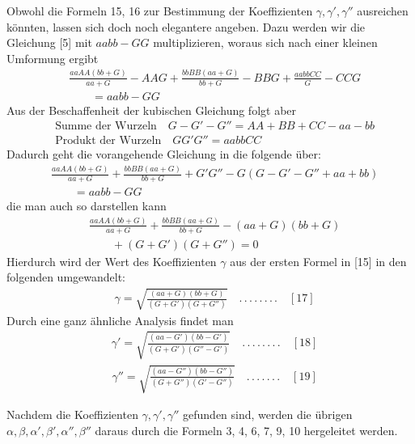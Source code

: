 \begingroup
\renewcommand{\arraystretch}{1.45}
Obwohl die Formeln 15, 16 zur Bestimmung der Koeffizienten $\gamma,\gamma',\gamma''$ ausreichen könnten, lassen sich doch noch elegantere angeben. Dazu werden wir die Gleichung [5] mit $aabb-GG$ multiplizieren, woraus sich nach einer kleinen Umformung ergibt
\[
\begin{aligned}
&\frac{aaAA(bb+G)}{aa+G}-AAG+\frac{bbBB(aa+G)}{bb+G}-BBG+\frac{aabbCC}{G}-CCG\\[6pt]
&\qquad{}=aabb-GG
\end{aligned}
\]
Aus der Beschaffenheit der kubischen Gleichung folgt aber
\[
\begin{aligned}
&\text{Summe der Wurzeln}\quad G-G'-G''=AA+BB+CC-aa-bb\\[8pt]
&\text{Produkt der Wurzeln}\quad GG'G''=aabbCC
\end{aligned}
\]
Dadurch geht die vorangehende Gleichung in die folgende über:
\[
\begin{aligned}
&\frac{aaAA(bb+G)}{aa+G}+\frac{bbBB(aa+G)}{bb+G}+G'G''-G(G-G'-G''+aa+bb)\\[6pt]
&\qquad{}=aabb-GG
\end{aligned}
\]
die man auch so darstellen kann
\[
\begin{aligned}
&\frac{aaAA(bb+G)}{aa+G}+\frac{bbBB(aa+G)}{bb+G}-(aa+G)(bb+G)\\[6pt]
&\qquad{}+(G+G')(G+G'')=0
\end{aligned}
\]
Hierdurch wird der Wert des Koeffizienten $\gamma$ aus der ersten Formel in [15] in den folgenden umgewandelt:
\[
\begin{aligned}
&\gamma=\surd{\frac{(aa+G)(bb+G)}{(G+G')(G+G'')}}\quad.\,.\,.\,.\,.\,.\,.\,.\quad[17]
\end{aligned}
\]
Durch eine ganz ähnliche Analysis findet man
\[
\begin{aligned}
&\gamma'=\surd{\frac{(aa-G')(bb-G')}{(G+G')(G''-G')}}\quad.\,.\,.\,.\,.\,.\,.\,.\quad[18]
\end{aligned}
\]
\[
\begin{aligned}
&\gamma''=\surd{\frac{(aa-G'')(bb-G'')}{(G+G'')(G'-G'')}}\quad.\,.\,.\,.\,.\,.\,.\quad[19]
\end{aligned}
\]
\par Nachdem die Koeffizienten $\gamma,\gamma',\gamma''$ gefunden sind, werden die übrigen $\alpha,\beta,\alpha',\beta',\alpha'',\beta''$ daraus durch die Formeln 3, 4, 6, 7, 9, 10 hergeleitet werden.

